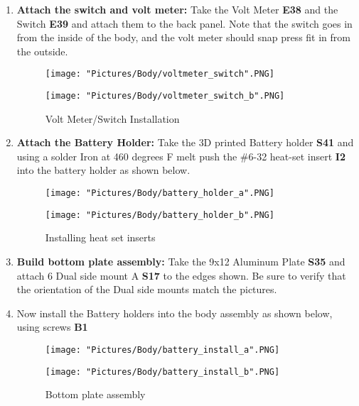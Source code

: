 \documentclass[12pt]{article}
\begin{document}
\begin{enumerate}
\item \textbf{Attach the switch and volt meter:} Take the Volt Meter \textbf{E38} and the Switch \textbf{E39} and attach them to the back panel. Note that the switch goes in from the inside of the body, and the volt meter should snap press fit in from the outside.

\begin{figure}[H]
  \centering
  \begin{minipage}[b]{0.45\textwidth}
    \texttt{[image: "Pictures/Body/voltmeter\_switch".PNG]}
  \end{minipage}
  \hfill
  \begin{minipage}[b]{0.45\textwidth}
    \texttt{[image: "Pictures/Body/voltmeter\_switch\_b".PNG]}
  \end{minipage}
  \caption{Volt Meter/Switch Installation}
  \label{bottom}
\end{figure}


\item \textbf{Attach the Battery Holder:} Take the 3D printed Battery holder \textbf{S41} and using a solder Iron at 460 degrees F melt push the \#6-32 heat-set insert  \textbf{I2} into the battery holder as shown below.

\begin{figure}[H]
  \centering
  \begin{minipage}[b]{0.45\textwidth}
    \texttt{[image: "Pictures/Body/battery\_holder\_a".PNG]}
  \end{minipage}
  \hfill
  \begin{minipage}[b]{0.45\textwidth}
    \texttt{[image: "Pictures/Body/battery\_holder\_b".PNG]}
  \end{minipage}
  \caption{Installing heat set inserts}
\end{figure}

\item \textbf{Build bottom plate assembly:} Take the 9x12 Aluminum Plate \textbf{S35} and attach 6 Dual side mount A \textbf{S17} to the edges shown. Be sure to verify that the orientation of the Dual side mounts match the pictures.

\item Now install the Battery holders into the body assembly as shown below, using screws \textbf{B1}

\begin{figure}[H]
  \centering
  \begin{minipage}[b]{0.45\textwidth}
    \texttt{[image: "Pictures/Body/battery\_install\_a".PNG]}
  \end{minipage}
  \hfill
  \begin{minipage}[b]{0.45\textwidth}
    \texttt{[image: "Pictures/Body/battery\_install\_b".PNG]}
  \end{minipage}
  \caption{Bottom plate assembly}
  \label{bottom}
\end{figure}



\end{enumerate}
\end{document}
